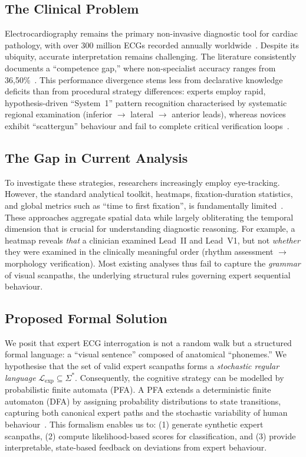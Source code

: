 \documentclass[sigconf]{acmart}
\theoremstyle{plain}
\theoremstyle{definition}
\begin{document}
\subsection{The Clinical Problem}
Electrocardiography remains the primary non-invasive diagnostic tool for cardiac pathology, with over 300 million ECGs recorded annually worldwide~\cite{davies2012}.
Despite its ubiquity, accurate interpretation remains challenging.
The literature consistently documents a ``competence gap,'' where non-specialist accuracy ranges from 36,50\%~\cite{wood2013}.
This performance divergence stems less from declarative knowledge deficits than from procedural strategy differences:
experts employ rapid, hypothesis-driven ``System~1'' pattern recognition characterised by systematic regional examination (inferior $\rightarrow$ lateral $\rightarrow$ anterior leads), whereas novices exhibit ``scattergun'' behaviour and fail to complete critical verification loops~\cite{bond2018}.

\subsection{The Gap in Current Analysis}
To investigate these strategies, researchers increasingly employ eye-tracking.
However, the standard analytical toolkit, heatmaps, fixation-duration statistics, and global metrics such as ``time to first fixation'', is fundamentally limited~\cite{sqalli2022}.
These approaches aggregate spatial data while largely obliterating the temporal dimension that is crucial for understanding diagnostic reasoning.
For example, a heatmap reveals \emph{that} a clinician examined Lead~II and Lead~V1, but not \emph{whether} they were examined in the clinically meaningful order (rhythm assessment $\rightarrow$ morphology verification).
Most existing analyses thus fail to capture the \emph{grammar} of visual scanpaths, the underlying structural rules governing expert sequential behaviour.

\subsection{Proposed Formal Solution}
We posit that expert ECG interrogation is not a random walk but a structured formal language: a ``visual sentence'' composed of anatomical ``phonemes.''
We hypothesise that the set of valid expert scanpaths forms a \emph{stochastic regular language} $\mathcal{L}_{\text{exp}} \subseteq \Sigma^*$.
Consequently, the cognitive strategy can be modelled by probabilistic finite automata (PFA).
A PFA extends a deterministic finite automaton (DFA) by assigning probability distributions to state transitions, capturing both canonical expert paths and the stochastic variability of human behaviour~\cite{vidal2005}.
This formalism enables us to:
(1) generate synthetic expert scanpaths,
(2) compute likelihood-based scores for classification, and
(3) provide interpretable, state-based feedback on deviations from expert behaviour.
\end{document}
